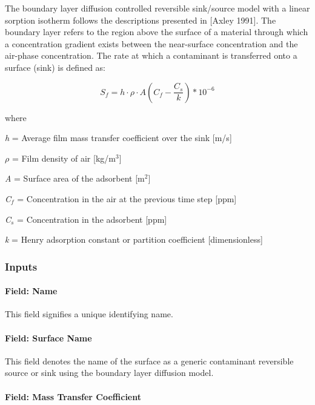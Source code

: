 The boundary layer diffusion controlled reversible sink/source model with a linear sorption isotherm follows the descriptions presented in {[}Axley 1991{]}. The boundary layer refers to the region above the surface of a material through which a concentration gradient exists between the near-surface concentration and the air-phase concentration. The rate at which a contaminant is transferred onto a surface (sink) is defined as:

\begin{equation}
{S_f} = h \cdot \rho \cdot A\left( {{C_f} - \frac{{{C_s}}}{k}} \right)*10^{-6}
\end{equation}

where

\emph{h} = Average film mass transfer coefficient over the sink {[}m/s{]}

\(\rho\) = Film density of air {[}kg/m\(^{3}\){]}

\emph{A} = Surface area of the adsorbent {[}m\(^{2}\){]}

\emph{C\(_{f}\)} = Concentration in the air at the previous time step {[}ppm{]}

\emph{C\(_{s}\)} = Concentration in the adsorbent {[}ppm{]}

\emph{k} = Henry adsorption constant or partition coefficient {[}dimensionless{]}

\subsubsection{Inputs}\label{inputs-15-006}

\paragraph{Field: Name}\label{field-name-15-004}

This field signifies a unique identifying name.

\paragraph{Field: Surface Name}\label{field-surface-name-3-000}

This field denotes the name of the surface as a generic contaminant reversible source or sink using the boundary layer diffusion model.

\paragraph{Field: Mass Transfer Coefficient}\label{field-mass-transfer-coefficient}

